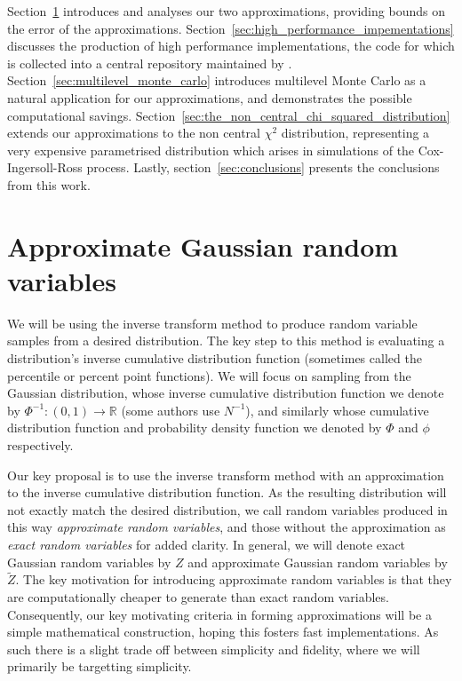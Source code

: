 \documentclass[manuscript,review]{acmart}
\begin{document}
Section~\ref{sec:approximate_gaussian_random_variables} introduces and analyses our two approximations, providing bounds on the error of the approximations. Section~\ref{sec:high_performance_impementations} discusses the production of high performance implementations, the code for which is collected into a central repository maintained by \citet{sheridan2020approximate_random,sheridan2020approximate_inverse}. Section~\ref{sec:multilevel_monte_carlo} introduces multilevel Monte Carlo as a natural application for our approximations, and demonstrates the possible computational savings. Section~\ref{sec:the_non_central_chi_squared_distribution} extends our approximations to the non central $ \chi^2 $ distribution, representing a very expensive parametrised distribution which arises in simulations of the Cox-Ingersoll-Ross process. Lastly, section~\ref{sec:conclusions} presents the conclusions from this work. 

\section{Approximate Gaussian random variables}
\label{sec:approximate_gaussian_random_variables}

We will be using the inverse transform method \citep[2.2.1]{glasserman2013monte} to produce random variable samples from a desired distribution. The key step to this method is evaluating a distribution's inverse cumulative distribution function (sometimes called the percentile or percent point functions). We will focus on sampling from the Gaussian distribution, whose inverse cumulative distribution function we denote by $ \Phi^{-1} \colon (0, 1) \to \mathbb{R} $ (some authors use $ N^{-1} $), and similarly whose cumulative distribution function and probability density function we denoted by $ \Phi $ and $ \phi $ respectively. 

Our key proposal is to use the inverse transform method with an approximation to the inverse cumulative distribution function. As the resulting distribution will not exactly match the desired distribution, we call random variables produced in this way \emph{approximate random variables}, and those without the approximation as \emph{exact random variables} for added clarity. In general, we will denote exact Gaussian random variables by $ Z $ and approximate Gaussian random variables by $ \widetilde{Z} $. The key motivation for introducing approximate random variables is that they are computationally cheaper to generate than exact random variables. Consequently, our key motivating criteria in forming approximations will be a simple mathematical construction, hoping this fosters fast implementations. As such there is a slight trade off between simplicity and fidelity, where we will primarily be targetting simplicity. 
\end{document}
